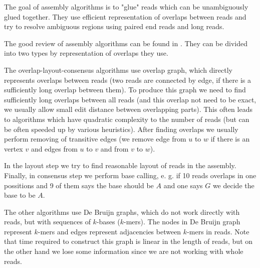 The goal of assembly algorithms is to "glue" reads which can be unambiguously glued together.
They use efficient representation of overlaps between reads and try to resolve
ambiguous regions using paired end reads and long reads.

The good review of assembly algorithms can be found in \cite{miller2010assembly}.
They can be divided into two types by representation of overlaps they use.

The overlap-layout-consensus algorithms use overlap graph, which directly represents
overlaps between reads (two reads are connected by edge, if there is a sufficiently long overlap between them).
To produce this graph we need to find sufficiently long
overlaps between all reads (and this overlap not need to be exact, we usually allow small edit distance between overlapping parts).
This often leads to algorithms which have quadratic
complexity to the number of reads (but can be often speeded up by various heuristics).
After finding overlaps we usually perform removing of transitive edges (we remove edge
from $u$ to $w$ if there is an vertex $v$ and edges from $u$ to $v$ and from $v$ to $w$).

In the layout step we try to find reasonable layout of reads in the assembly.
Finally, in consensus step we perform base calling, e. g. if 10 reads overlaps in
one possitions and 9 of them says the base should be $A$ and one says $G$ we decide the base to
be $A$.


\medskip

The other algorithms use De Bruijn graphs, which do not work directly with reads, but
with sequences of $k$-bases ($k$-mers). The nodes in De Bruijn graph represent $k$-mers
and edges represent adjacencies between $k$-mers in reads. Note that time
required to construct this graph is linear in the length of reads, but on the other hand
we lose some information since we are not working with whole reads.
